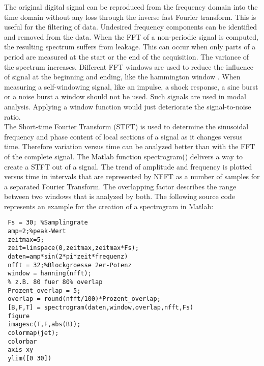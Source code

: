The original digital signal can be reproduced from the frequency domain into the time domain without any loss through the inverse fast Fourier transform. This is useful for the filtering of data. Undesired frequency components can be identified and removed from the data.
When the FFT of a non-periodic signal is computed, the resulting spectrum suffers from leakage. This can occur when only parts of a period are measured at the start or the end of the acquisition. The variance of the spectrum increases. Different FFT windows are used to reduce the influence of signal at the beginning and ending, like the hammington window \cite{proakis2001digital}. When measuring a self-windowing signal, like an impulse, a shock response, a sine burst or a noise burst a window should not be used. Such signals are used in modal analysis. Applying a window function would just deteriorate the signal-to-noise ratio.\\

The Short-time Fourier Transform (STFT) is used to determine the sinusoidal frequency and phase content of local sections of a signal as it changes versus time. Therefore variation versus time can be analyzed better than with the FFT of the complete signal. The Matlab function spectrogram() delivers a way to create a STFT out of a signal. The trend of amplitude and frequency is plotted versus time in intervals that are represented by NFFT as a number of samples for a separated Fourier Transform. The overlapping factor describes the range between two windows that is analyzed by both. The following source code represents an example for the creation of a spectrogram in Matlab:

\begin{lstlisting} 
 Fs = 30; %Samplingrate
 amp=2;%peak-Wert
 zeitmax=5;
 zeit=linspace(0,zeitmax,zeitmax*Fs);
 daten=amp*sin(2*pi*zeit*frequenz)
 nfft = 32;%Blockgroesse 2er-Potenz
 window = hanning(nfft);
 % z.B. 80 fuer 80% overlap
 Prozent_overlap = 5;
 overlap = round(nfft/100)*Prozent_overlap;
 [B,F,T] = spectrogram(daten,window,overlap,nfft,Fs)
 figure
 imagesc(T,F,abs(B));
 colormap(jet);
 colorbar
 axis xy
 ylim([0 30])
\end{lstlisting} 
 

\newpage
